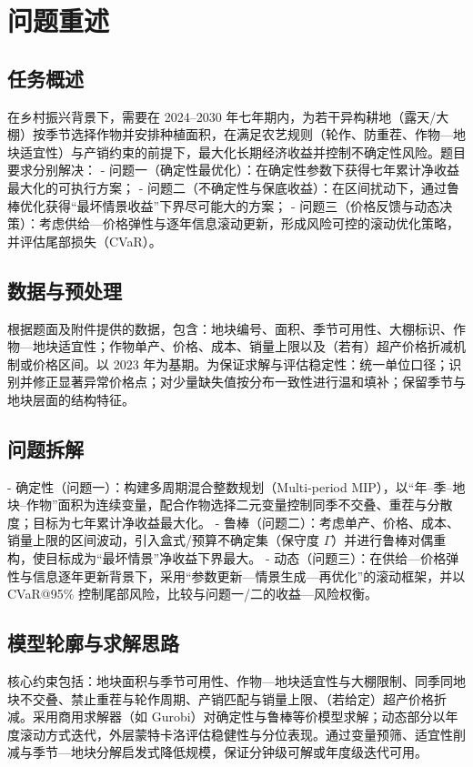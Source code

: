\section{问题重述}

\subsection{任务概述}
在乡村振兴背景下，需要在 2024--2030 年七年期内，为若干异构耕地（露天/大棚）按季节选择作物并安排种植面积，在满足农艺规则（轮作、防重茬、作物—地块适宜性）与产销约束的前提下，最大化长期经济收益并控制不确定性风险。题目要求分别解决：
- 问题一（确定性最优化）：在确定性参数下获得七年累计净收益最大化的可执行方案；
- 问题二（不确定性与保底收益）：在区间扰动下，通过鲁棒优化获得“最坏情景收益”下界尽可能大的方案；
- 问题三（价格反馈与动态决策）：考虑供给—价格弹性与逐年信息滚动更新，形成风险可控的滚动优化策略，并评估尾部损失（CVaR）。

\subsection{数据与预处理}
根据题面及附件提供的数据，包含：地块编号、面积、季节可用性、大棚标识、作物—地块适宜性；作物单产、价格、成本、销量上限以及（若有）超产价格折减机制或价格区间。以 2023 年为基期。为保证求解与评估稳定性：统一单位口径；识别并修正显著异常价格点；对少量缺失值按分布一致性进行温和填补；保留季节与地块层面的结构特征。

\subsection{问题拆解}
- 确定性（问题一）：构建多周期混合整数规划（Multi-period MIP），以“年–季–地块–作物”面积为连续变量，配合作物选择二元变量控制同季不交叠、重茬与分散度；目标为七年累计净收益最大化。
- 鲁棒（问题二）：考虑单产、价格、成本、销量上限的区间波动，引入盒式/预算不确定集（保守度 \(\Gamma\)）并进行鲁棒对偶重构，使目标成为“最坏情景”净收益下界最大。
- 动态（问题三）：在供给—价格弹性与信息逐年更新背景下，采用“参数更新—情景生成—再优化”的滚动框架，并以 CVaR@95\% 控制尾部风险，比较与问题一/二的收益—风险权衡。

\subsection{模型轮廓与求解思路}
核心约束包括：地块面积与季节可用性、作物—地块适宜性与大棚限制、同季同地块不交叠、禁止重茬与轮作周期、产销匹配与销量上限、（若给定）超产价格折减。采用商用求解器（如 Gurobi）对确定性与鲁棒等价模型求解；动态部分以年度滚动方式迭代，外层蒙特卡洛评估稳健性与分位表现。通过变量预筛、适宜性削减与季节—地块分解启发式降低规模，保证分钟级可解或年度级迭代可用。

